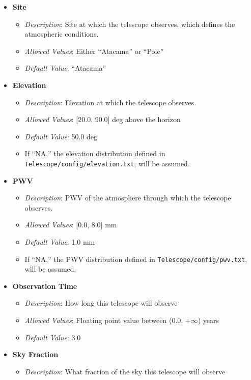 \documentclass[11pt]{article} %
\begin{document}
\begin{itemize}[noitemsep,topsep=0pt]
	\item \textbf{Site}
		\begin{itemize}[noitemsep,topsep=0pt]
		\item \textit{Description}: Site at which the telescope observes, which defines the atmospheric conditions. 
		\item \textit{Allowed Values}: Either ``Atacama'' or ``Pole''
		\item \textit{Default Value}: ``Atacama''
		\end{itemize}
	\item \textbf{Elevation}
		\begin{itemize}[noitemsep,topsep=0pt]
		\item \textit{Description}: Elevation at which the telescope observes. 
		\item \textit{Allowed Values}: [20.0, 90.0] deg above the horizon
		\item \textit{Default Value}: 50.0 deg
		\item If ``NA,'' the elevation distribution defined in \texttt{Telescope/config/elevation.txt}, will be assumed.
		\end{itemize}
	\item \textbf{PWV}
		\begin{itemize}[noitemsep,topsep=0pt]
		\item \textit{Description}: PWV of the atmosphere through which the telescope observes.
		\item \textit{Allowed Values}: [0.0, 8.0] mm
		\item \textit{Default Value}: 1.0 mm
		\item If ``NA,'' the PWV distribution defined in \texttt{Telescope/config/pwv.txt}, will be assumed.
		\end{itemize}
	\item \textbf{Observation Time}
		\begin{itemize}[noitemsep,topsep=0pt]
		\item \textit{Description}: How long this telescope will observe 
		\item \textit{Allowed Values}: Floating point value between (0.0, $+\infty$) years
		\item \textit{Default Value}: 3.0
		\end{itemize}
	\item \textbf{Sky Fraction}
		\begin{itemize}[noitemsep,topsep=0pt]
		\item \textit{Description}: What fraction of the sky this telescope will observe

\end{itemize}
\end{itemize}
\end{document}
